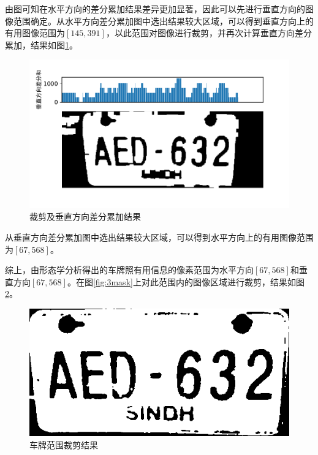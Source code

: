 \documentclass[a4paper]{ctexart}
\begin{document}
\begin{spacing}{1.35}
\begin{figure}[htbp]
	\end{figure}
	由图可知在水平方向的差分累加结果差异更加显著，因此可以先进行垂直方向的图像范围确定。从水平方向差分累加图中选出结果较大区域，可以得到垂直方向上的有用图像范围为$\left[145,391\right]$，以此范围对图像进行裁剪，并再次计算垂直方向差分累加，结果如图\ref{fig:3ghist1}。
	\begin{figure}[htbp]
		\centering
		\includegraphics[width=\textwidth]{figure/3Ghist1.pdf}
		\caption{裁剪及垂直方向差分累加结果}\label{fig:3ghist1}
	\end{figure}
	从垂直方向差分累加图中选出结果较大区域，可以得到水平方向上的有用图像范围为$\left[67,568\right]$。

	综上，由形态学分析得出的车牌照有用信息的像素范围为水平方向$\left[67,568\right]$和垂直方向$\left[67,568\right]$。在图\ref{fig:3mask}上对此范围内的图像区域进行裁剪，结果如图\ref{fig:3maskcut}。
	\begin{figure}[htbp]
		\centering
		\includegraphics[width=\textwidth]{figure/3maskcut.png}
		\caption{车牌范围裁剪结果}\label{fig:3maskcut}
	\end{figure}


\end{spacing}
\end{document}
